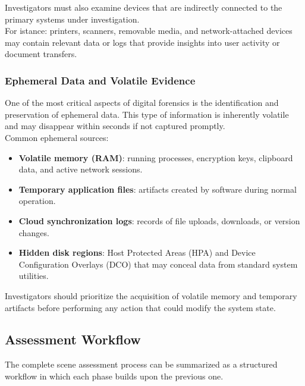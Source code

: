 Investigators must also examine devices that are indirectly connected to the primary systems under investigation. \\
For istance: printers, scanners, removable media, and network-attached devices may contain relevant data or logs that provide insights into user activity or document transfers.


\subsubsection{Ephemeral Data and Volatile Evidence}

One of the most critical aspects of digital forensics is the identification and preservation of ephemeral data. This type of information is inherently volatile and may disappear within seconds if not captured promptly.
\\
Common ephemeral sources:

\begin{itemize}
\item \textbf{Volatile memory (RAM)}: running processes, encryption keys, clipboard data, and active network sessions.
\item \textbf{Temporary application files}: artifacts created by software during normal operation.
\item \textbf{Cloud synchronization logs}: records of file uploads, downloads, or version changes.
\item \textbf{Hidden disk regions}: Host Protected Areas (HPA) and Device Configuration Overlays (DCO) that may conceal data from standard system utilities.
\end{itemize}

\noindent
Investigators should prioritize the acquisition of volatile memory and temporary artifacts before performing any action that could modify the system state.

\subsection{Assessment Workflow}

The complete scene assessment process can be summarized as a structured workflow in which each phase builds upon the previous one.

